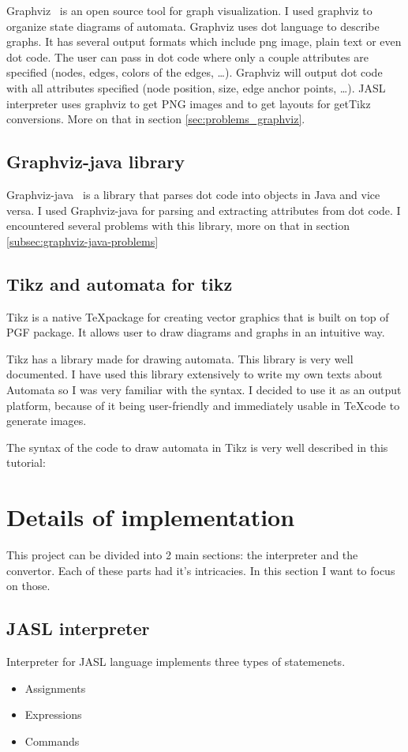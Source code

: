 \documentclass{ctuthesis}
\begin{document}
Graphviz~\cite{graphviz} is an open source tool for graph visualization. I used graphviz to organize state diagrams of automata. Graphviz uses dot language to describe graphs. It has several output formats which include png image, plain text or even dot code. The user can pass in dot code where only a couple attributes are specified (nodes, edges, colors of the edges, \ldots). Graphviz will output dot code with all attributes specified (node position, size, edge anchor points, \ldots).  JASL interpreter uses graphviz to get PNG images and to get layouts for getTikz conversions. More on that in section \ref{sec:problems_graphviz}.

\subsection{Graphviz-java library}
Graphviz-java~\cite{graphviz-java} is a library that parses dot code into objects in Java and vice versa. I used Graphviz-java for parsing and extracting attributes from dot code. I encountered several problems with this library, more on that in section \ref{subsec:graphviz-java-problems}

\subsection{Tikz and automata for tikz}
Tikz is a native \TeX package for creating vector graphics that is built on top of PGF package. It allows user to draw diagrams and graphs in an intuitive way.

Tikz has a library made for drawing automata. This library is very well documented. I have used this library extensively to write my own texts about Automata so I was very familiar with the syntax. I decided to use it as an output platform, because of it being user-friendly and immediately usable in \TeX code to generate images.

The syntax of the code to draw automata in Tikz is very well described in this tutorial:~\cite{tikz-tut}

\section{Details of implementation}
This project can be divided into 2 main sections: the interpreter and the convertor. Each of these parts had it's intricacies. In this section I want to focus on those.

\subsection{JASL interpreter}
Interpreter for JASL language implements three types of statemenets.
\begin{itemize}
	\item Assignments
	\item Expressions
	\item Commands
\end{itemize}
\end{document}
